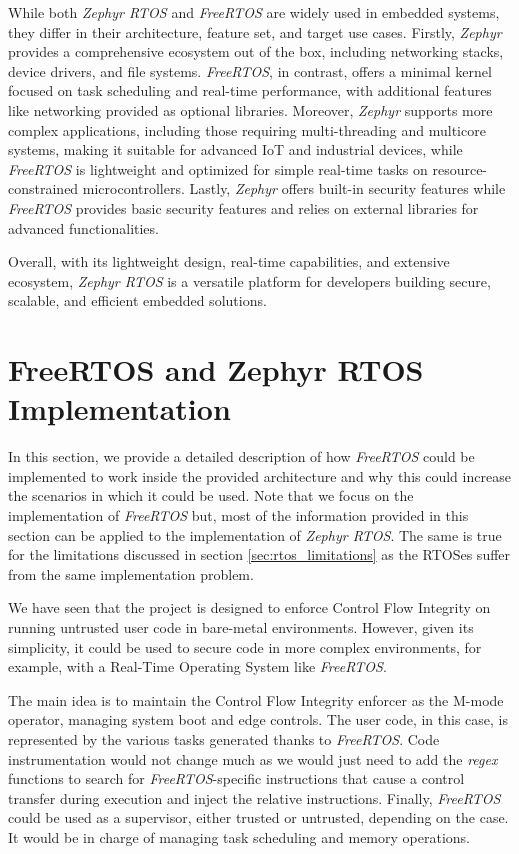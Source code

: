 While both \textit{Zephyr RTOS} and \textit{FreeRTOS} are widely used in embedded
systems, they differ in their architecture, feature set, and target use cases. Firstly,
\textit{Zephyr} provides a comprehensive ecosystem out of the box, including
networking stacks, device drivers, and file systems. \textit{FreeRTOS}, in contrast,
offers a minimal kernel focused on task scheduling and real-time performance, with
additional features like networking provided as optional libraries. Moreover, \textit{Zephyr}
supports more complex applications, including those requiring multi-threading and
multicore systems, making it suitable for advanced IoT and industrial devices, while
\textit{FreeRTOS} is lightweight and optimized for simple real-time tasks on
resource-constrained microcontrollers. Lastly, \textit{Zephyr} offers built-in security
features while \textit{FreeRTOS} provides basic security features and relies on
external libraries for advanced functionalities.

Overall, with its lightweight design, real-time capabilities, and extensive ecosystem,
\textit{Zephyr RTOS} is a versatile platform for developers building secure,
scalable, and efficient embedded solutions.

\section{FreeRTOS and Zephyr RTOS Implementation}
\label{sec:rtos_porting}

In this section, we provide a detailed description of how \textit{FreeRTOS}
could be implemented to work inside the provided architecture and why this could
increase the scenarios in which it could be used. Note that we focus on the implementation
of \textit{FreeRTOS} but, most of the information provided in this section can be
applied to the implementation of \textit{Zephyr RTOS}. The same is true for the limitations
discussed in section \ref{sec:rtos_limitations} as the RTOSes suffer from the same
implementation problem.

We have seen that the project is designed to enforce Control Flow Integrity on running
untrusted user code in bare-metal environments. However, given its simplicity,
it could be used to secure code in more complex environments, for example, with
a Real-Time Operating System like \textit{FreeRTOS}.

The main idea is to maintain the Control Flow Integrity enforcer as the M-mode operator,
managing system boot and edge controls. The user code, in this case, is represented
by the various tasks generated thanks to \textit{FreeRTOS}. Code instrumentation
would not change much as we would just need to add the \textit{regex} functions
to search for \textit{FreeRTOS}-specific instructions that cause a control transfer
during execution and inject the relative instructions. Finally, \textit{FreeRTOS}
could be used as a supervisor, either trusted or untrusted, depending on the
case. It would be in charge of managing task scheduling and memory operations.


